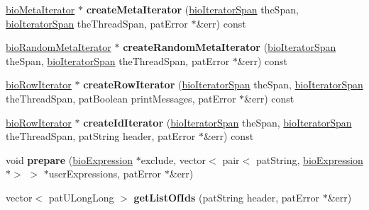 \begin{DoxyCompactItemize}
\mbox{\label{classbio_sample_ad2cffc4d483db4155b9f08cf138caa0a}} 
\hyperlink{classbio_meta_iterator}{bio\+Meta\+Iterator} $\ast$ {\bfseries create\+Meta\+Iterator} (\hyperlink{classbio_iterator_span}{bio\+Iterator\+Span} the\+Span, \hyperlink{classbio_iterator_span}{bio\+Iterator\+Span} the\+Thread\+Span, pat\+Error $\ast$\&err) const
\item 
\mbox{\label{classbio_sample_a5c2c06741d9ff9d3e40e2294bfd7c4db}} 
\hyperlink{classbio_random_meta_iterator}{bio\+Random\+Meta\+Iterator} $\ast$ {\bfseries create\+Random\+Meta\+Iterator} (\hyperlink{classbio_iterator_span}{bio\+Iterator\+Span} the\+Span, \hyperlink{classbio_iterator_span}{bio\+Iterator\+Span} the\+Thread\+Span, pat\+Error $\ast$\&err) const
\item 
\mbox{\label{classbio_sample_af0e58da154abb72fa3805fe23d935de5}} 
\hyperlink{classbio_row_iterator}{bio\+Row\+Iterator} $\ast$ {\bfseries create\+Row\+Iterator} (\hyperlink{classbio_iterator_span}{bio\+Iterator\+Span} the\+Span, \hyperlink{classbio_iterator_span}{bio\+Iterator\+Span} the\+Thread\+Span, pat\+Boolean print\+Messages, pat\+Error $\ast$\&err) const
\item 
\mbox{\label{classbio_sample_a1af652984dad9771c202e367c66622d4}} 
\hyperlink{classbio_row_iterator}{bio\+Row\+Iterator} $\ast$ {\bfseries create\+Id\+Iterator} (\hyperlink{classbio_iterator_span}{bio\+Iterator\+Span} the\+Span, \hyperlink{classbio_iterator_span}{bio\+Iterator\+Span} the\+Thread\+Span, pat\+String header, pat\+Error $\ast$\&err) const
\item 
\mbox{\label{classbio_sample_ab2560bcb3968585246eab37ebd22f892}} 
void {\bfseries prepare} (\hyperlink{classbio_expression}{bio\+Expression} $\ast$exclude, vector$<$ pair$<$ pat\+String, \hyperlink{classbio_expression}{bio\+Expression} $\ast$$>$ $>$ $\ast$user\+Expressions, pat\+Error $\ast$\&err)
\item 
\mbox{\label{classbio_sample_a8dfc7207f07bb239b653efe5f777e123}} 
vector$<$ pat\+U\+Long\+Long $>$ {\bfseries get\+List\+Of\+Ids} (pat\+String header, pat\+Error $\ast$\&err)
\item 
\mbox{\label{classbio_sample_a5a8e8ca6bfaa0887b1318eaf4fbd0d0f}} 
$$
\end{DoxyCompactItemize}
